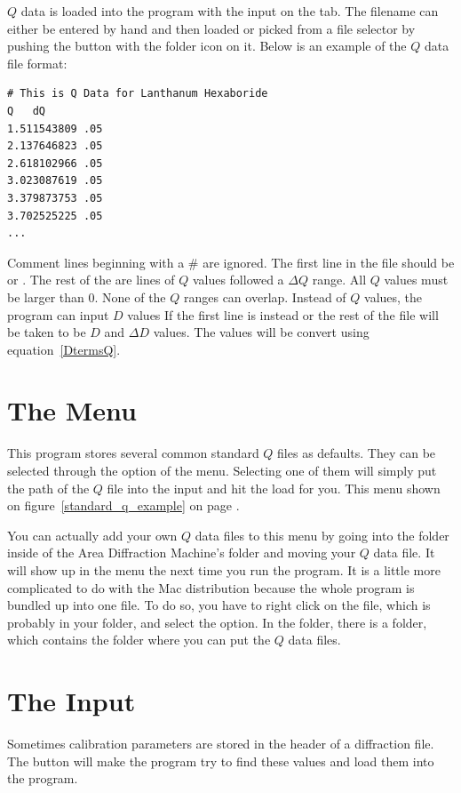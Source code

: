 $Q$ data is loaded into the program with the 
input on the  tab. The filename can either 
be entered by hand and then loaded or picked from a file selector 
by pushing the button with the folder icon on it.  Below is an example 
of the $Q$ data file format: 
\begin{lstlisting}
# This is Q Data for Lanthanum Hexaboride
Q   dQ
1.511543809 .05
2.137646823 .05
2.618102966 .05
3.023087619 .05
3.379873753 .05
3.702525225 .05
...
\end{lstlisting}
Comment lines beginning with a \# are ignored. The
first line in the file should be  or 
. The 
rest of the are lines of $Q$ values followed a $\Delta Q$ range.
All $Q$ values must be larger than 0. None of the $Q$ ranges can 
overlap. Instead of $Q$ values, the program can input $D$ values 
If the first line is instead  or  the rest of 
the file will be taken to be $D$ and $\Delta D$ values.
The values will be convert using equation~\ref{DtermsQ}. 

\section{\texorpdfstring{The  Menu}{The Standard Q Menu}}

This program stores several common standard $Q$ files as defaults. 
They can be selected through the  option of the 
 menu. Selecting one of them will simply put the path
of the $Q$ file into the  input and hit the load for you.
This menu shown on figure~\ref{standard_q_example} on
page \pageref{standard_q_example}. 

You can actually add your own $Q$ data files to this menu by
going into the  folder inside of the Area
Diffraction Machine's folder and moving your $Q$ data file.
It will show up in the menu the next time you run the program.
It is a little more complicated to do with the Mac distribution
because the whole program is bundled up into one  file.
To do so, you have to right click on the  file, which
is probably in your  folder, and select
the  option. In the 
folder, there is a  folder, which contains 
the  folder where you can put the $Q$ data files.

\section{\texorpdfstring{The  Input}
    {The ''Get From Header'' Input}}

Sometimes calibration parameters are stored in the header of
a diffraction file.  The  button will 
make the program try to find these values and load them into the 
program.
